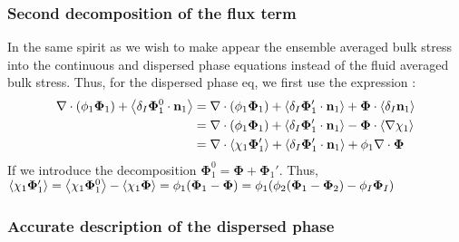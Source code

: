 \subsubsection{Second decomposition of the flux term}
In the same spirit as \citet{chu2016flux} we wish to make appear the ensemble averaged bulk stress into the continuous and dispersed phase equations instead of the fluid averaged bulk stress. 
Thus, for the dispersed phase eq, we first use the expression :
\begin{align*}
    \mathbf{\nabla} \cdot  (\phi_1 \mathbf{\Phi}_1)
    + \left<\delta_I \mathbf{\Phi}_1^0 \cdot \textbf{n}_1\right>
    &=
    \mathbf{\nabla} \cdot  (\phi_1 \mathbf{\Phi}_1)
    + \left<\delta_I \mathbf{\Phi}_1' \cdot \textbf{n}_1\right>
    + \mathbf{\Phi} \cdot  \left<\delta_I \textbf{n}_1\right>\\
    &=
    \mathbf{\nabla} \cdot  (\phi_1 \mathbf{\Phi}_1)
    + \left<\delta_I \mathbf{\Phi}_1' \cdot \textbf{n}_1\right>
    - \mathbf{\Phi} \cdot  \left<\mathbf{\nabla}\chi_1\right>\\
    &=
    \mathbf{\nabla} \cdot  \left<\chi_1 \mathbf{\Phi}_1'\right>
    + \left<\delta_I \mathbf{\Phi}_1' \cdot \textbf{n}_1\right>
    + \phi_1 \mathbf{\nabla} \cdot \bm{\Phi}\\
\end{align*}
If we introduce the decomposition  $\mathbf{\Phi}_1^0 =  \mathbf{\Phi} + \mathbf{\Phi}_1'$.
Thus, $\left<\chi_1\mathbf{\Phi}_1'\right> 
= \left<\chi_1 \mathbf{\Phi}_1^0\right> - \left<\chi_1\mathbf{\Phi}\right>
= \phi_1 (\mathbf{\Phi}_1 - \mathbf{\Phi})
= \phi_1 ( \phi_2 (\mathbf{\Phi}_1  -  \mathbf{\Phi}_2)  - \phi_I \mathbf{\Phi}_I )$


\subsubsection{Accurate description of the dispersed phase}


